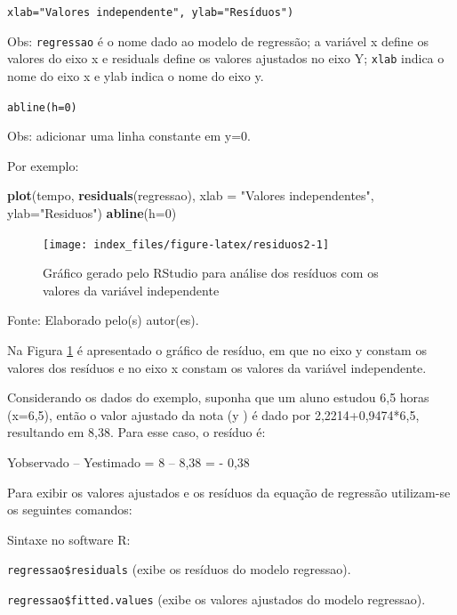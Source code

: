 \documentclass[12pt,brazil,oneside]{book}
\newenvironment{Shaded}{\begin{snugshade}}{\end{snugshade}}
\newcommand{\DataTypeTok}[1]{\textcolor[rgb]{0.13,0.29,0.53}{#1}}
\newcommand{\DecValTok}[1]{\textcolor[rgb]{0.00,0.00,0.81}{#1}}
\newcommand{\KeywordTok}[1]{\textcolor[rgb]{0.13,0.29,0.53}{\textbf{#1}}}
\newcommand{\NormalTok}[1]{#1}
\newcommand{\StringTok}[1]{\textcolor[rgb]{0.31,0.60,0.02}{#1}}
\begin{document}
\texttt{xlab="Valores\ independente",\ ylab="Resíduos")}

Obs: \texttt{regressao} é o nome dado ao modelo de regressão; a variável x define os valores do eixo x e residuals define os valores ajustados no eixo Y; \texttt{xlab} indica o nome do eixo x e ylab indica o nome do eixo y.

\texttt{abline(h=0)}

Obs: adicionar uma linha constante em y=0.

Por exemplo:

\begin{Shaded}
\begin{Highlighting}[]
\KeywordTok{plot}\NormalTok{(tempo, }\KeywordTok{residuals}\NormalTok{(regressao), }\DataTypeTok{xlab =} \StringTok{"Valores independentes"}\NormalTok{,}
\DataTypeTok{ylab=}\StringTok{"Residuos"}\NormalTok{)}
\KeywordTok{abline}\NormalTok{(}\DataTypeTok{h=}\DecValTok{0}\NormalTok{)}
\end{Highlighting}
\end{Shaded}

\begin{figure}[H]

{\centering \texttt{[image: index\_files/figure-latex/residuos2-1]} 

}

\caption{Gráfico gerado pelo RStudio para análise dos resíduos com os valores da variável independente}\label{fig:residuos2}
\end{figure}

Fonte: Elaborado pelo(s) autor(es).

Na Figura \ref{fig:residuos2} é apresentado o gráfico de resíduo, em que no eixo y constam os valores dos resíduos e no eixo x constam os valores da variável independente.

Considerando os dados do exemplo, suponha que um aluno estudou 6,5 horas (x=6,5), então o valor ajustado da nota (y ) é dado por 2,2214+0,9474*6,5, resultando em 8,38. Para esse caso, o resíduo é:

Yobservado -- Yestimado = 8 -- 8,38 = - 0,38

Para exibir os valores ajustados e os resíduos da equação de regressão utilizam-se os seguintes comandos:

Sintaxe no software R:

\texttt{regressao\$residuals} (exibe os resíduos do modelo regressao).

\texttt{regressao\$fitted.values} (exibe os valores ajustados do modelo regressao).
\end{document}
